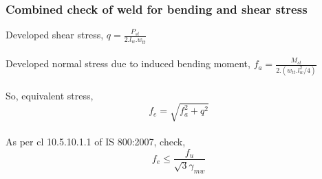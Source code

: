 \documentclass[11.5pt,a4paper,oneside]{report}
\begin{document}
\begin{Form}
\subsubsection{Combined check of weld for bending and shear stress}
Developed shear stress, $q = \frac{P_{st}}{2.l_w.w_{tt}}$\\
\\
Developed normal stress due to induced bending moment, $f_a = \frac{ M_{st}}{2.(w_{tt}.l_w^2/4)}$\\
\\
So, equivalent stress, 
\begin{equation}
f_e = \sqrt{f_a^2 + q^2}
\end{equation}
\\
As per cl 10.5.10.1.1 of IS 800:2007, check, 
\begin{equation}
f_e \leq \frac{f_u}{\sqrt{3} \gamma_{mw}}
\end{equation}


\end{Form}
\end{document}
